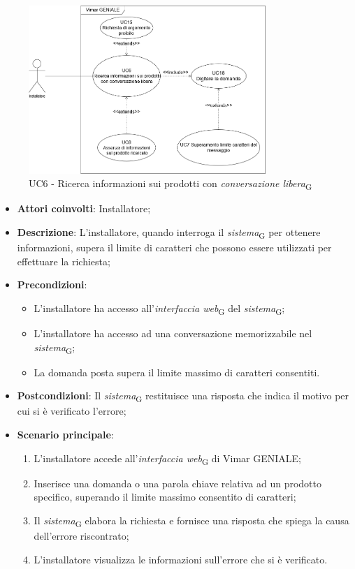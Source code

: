 \begin{figure}[H]
\centering
\includegraphics[width=0.8\textwidth]{contents/casi_duso/png/UC6.png}
\caption{UC6 - Ricerca informazioni sui prodotti con \textit{conversazione libera}\textsubscript{G}}
\end{figure}


\begin{itemize}
    \item \textbf{Attori coinvolti}: Installatore;
    \item \textbf{Descrizione}: L’installatore, quando interroga il \textit{sistema}\textsubscript{G} per ottenere informazioni, supera il limite di caratteri che possono essere utilizzati per effettuare la richiesta;
    \item \textbf{Precondizioni}: 
        \begin{itemize}
            \item L’installatore ha accesso all’\textit{interfaccia web}\textsubscript{G} del \textit{sistema}\textsubscript{G};
            \item L’installatore ha accesso ad una conversazione memorizzabile nel \textit{sistema}\textsubscript{G};
            \item La domanda posta supera il limite massimo di caratteri consentiti.
        \end{itemize}
    \item \textbf{Postcondizioni}: Il \textit{sistema}\textsubscript{G} restituisce una risposta che indica il motivo per cui si è verificato l’errore;
    \item \textbf{Scenario principale}:
    \begin{enumerate}
    \item L’installatore accede all’\textit{interfaccia web}\textsubscript{G} di Vimar GENIALE;
    \item Inserisce una domanda o una parola chiave relativa ad un prodotto specifico, superando il limite massimo consentito di caratteri;
    \item Il \textit{sistema}\textsubscript{G} elabora la richiesta e fornisce una risposta che spiega la causa dell'errore riscontrato;
    \item L’installatore visualizza le informazioni sull’errore che si è verificato.
    \end{enumerate}
\end{itemize}


